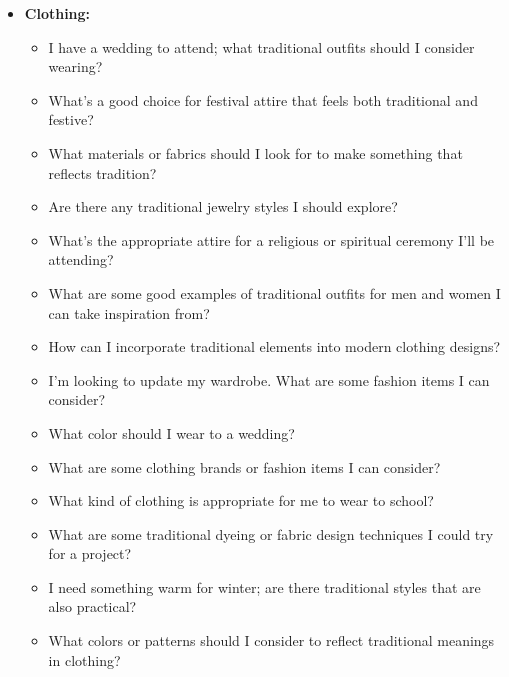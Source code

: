 \begin{itemize}
  \item \textbf{Clothing:}
  \begin{itemize}
    \item I have a wedding to attend; what traditional outfits should I consider wearing?
    \item What's a good choice for festival attire that feels both traditional and festive?
    \item What materials or fabrics should I look for to make something that reflects tradition?
    \item Are there any traditional jewelry styles I should explore?
    \item What's the appropriate attire for a religious or spiritual ceremony I'll be attending?
    \item What are some good examples of traditional outfits for men and women I can take inspiration from?
    \item How can I incorporate traditional elements into modern clothing designs?
    \item I'm looking to update my wardrobe. What are some fashion items I can consider?
    \item What color should I wear to a wedding?
    \item What are some clothing brands or fashion items I can consider?
    \item What kind of clothing is appropriate for me to wear to school?
    \item What are some traditional dyeing or fabric design techniques I could try for a project?
    \item I need something warm for winter; are there traditional styles that are also practical?
    \item What colors or patterns should I consider to reflect traditional meanings in clothing?
  \end{itemize}
\end{itemize}


